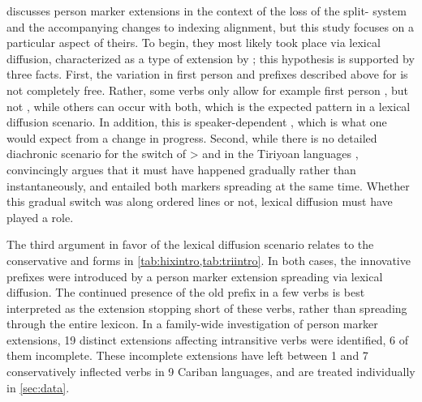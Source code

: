 
\textcite{gildea1998} discusses person marker extensions in the context of the loss of the split- system and the accompanying changes to indexing alignment, but this study focuses on a particular aspect of theirs.
To begin, they most likely took place via lexical diffusion, characterized as a type of extension by \textcite[106--115]{harris1995historical}; this hypothesis is supported by three facts.
First, the variation in first person and  prefixes described above for \kaxui is not completely free.
Rather, some verbs only allow for example first person , but not , while others can occur with both, which is the expected pattern in a lexical diffusion scenario.
In addition, this is speaker-dependent , which is what one would expect from a change in progress.
Second, while there is no detailed diachronic scenario for the switch of >  and  in the Tiriyoan languages , \textcite[111--112]{meira1998proto} convincingly argues that it must have happened gradually rather than instantaneously, and entailed both markers spreading at the same time.
Whether this gradual switch was along ordered lines or not, lexical diffusion must have played a role.

The third argument in favor of the lexical diffusion scenario relates to the conservative \hixka and \trio forms in \cref{tab:hixintro,tab:triintro}.
In both cases, the innovative  prefixes were introduced by a person marker extension spreading via lexical diffusion.
The continued presence of the old  prefix in a few verbs is best interpreted as the extension stopping short of these verbs, rather than spreading through the entire  lexicon.
In a family-wide investigation of person marker extensions, 19 distinct extensions affecting intransitive verbs were identified, 6 of them incomplete.
These incomplete extensions have left between 1 and 7 conservatively inflected verbs in 9 Cariban languages, and are treated individually in \cref{sec:data}.

